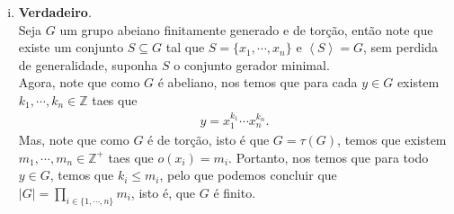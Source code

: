 \begin{homeworkProblem}
\begin{solution}
\begin{enumerate}[i)]
\begin{align*}
\begin{pmatrix}
      1 & -2 \\
      0& 1
      \end{pmatrix}\\
      (xy)^{k}&=\begin{pmatrix}
      1 & -k \\
      0 & 1
      \end{pmatrix},
    \end{align*}
    i,e, $o(xy)=\infty$, logo se pegamos $G=\left\langle x,y \right\rangle$ temos que $G$ é finitamente gerado por elementos de torção, mas $|G|=\infty$.
  \item \textbf{Verdadeiro}.\\
    Seja $G$ um grupo abeiano finitamente generado e de torção, então note que existe um conjunto $S\subseteq G$ tal que $S=\{x_1,\cdots,x_n\}$ e $\left\langle S \right\rangle=G$, sem perdida de generalidade, suponha $S$ o conjunto gerador minimal.\\
    Agora, note que como $G$ é abeliano, nos temos que para cada $y\in G$ existem $k_1,\cdots,k_n\in\mathbb{Z}$ taes que
    \begin{align*}
      y=x_1^{k_1}\cdots x_n^{k_n}.
    \end{align*}
    Mas, note que como $G$ é de torção, isto é que $G=\tau(G)$, temos que existem $m_1,\cdots,m_n\in\mathbb{Z}^{+}$ taes que $o(x_i)=m_i$. Portanto, nos temos que para todo $y\in G$, temos que $k_i\leq m_i$, pelo que podemos concluir que $|G|=\prod_{i\in\{1,\cdots,n\}}m_i$, isto é, que $G$ é finito. 
\end{enumerate}
  \end{solution}
\end{homeworkProblem}
